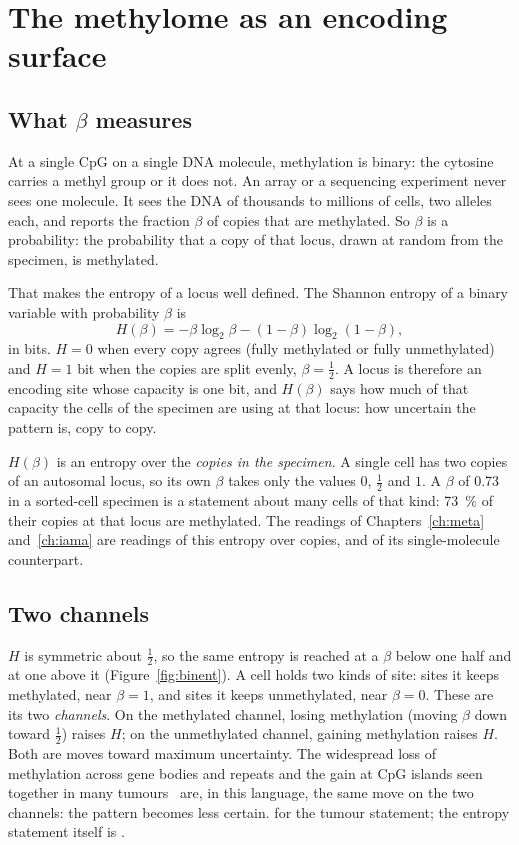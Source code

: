 \chapter{The methylome as an encoding surface}\label{ch:surface}

\section{What $\beta$ measures}

At a single CpG on a single DNA molecule, methylation is binary: the cytosine carries a methyl group
or it does not. An array or a sequencing experiment never sees one molecule. It sees the DNA of
thousands to millions of cells, two alleles each, and reports the fraction $\beta$ of copies that
are methylated. So $\beta$ is a probability: the probability that a copy of that locus, drawn at
random from the specimen, is methylated.

That makes the entropy of a locus well defined. The Shannon entropy of a binary variable with
probability $\beta$ is
\begin{equation}
  H(\beta)=-\beta\log_2\beta-(1-\beta)\log_2(1-\beta),
  \label{eq:H}
\end{equation}
in bits. $H=0$ when every copy agrees (fully methylated or fully unmethylated) and $H=1$ bit when
the copies are split evenly, $\beta=\tfrac12$. \derived{} A locus is therefore an encoding site
whose capacity is one bit, and $H(\beta)$ says how much of that capacity the cells of the specimen are
using at that locus: how uncertain the pattern is, copy to copy.

\begin{remark}
$H(\beta)$ is an entropy over the \emph{copies in the specimen}. A single cell has two copies of an
autosomal locus, so its own $\beta$ takes only the values $0$, $\tfrac12$ and $1$. A $\beta$ of 0.73
in a sorted-cell specimen is a statement about many cells of that kind: 73~\% of their copies at
that locus are methylated. The readings of Chapters~\ref{ch:meta} and~\ref{ch:iama} are readings of this entropy over copies, and of its single-molecule counterpart.
\end{remark}

\section{Two channels}

$H$ is symmetric about $\tfrac12$, so the same entropy is reached at a $\beta$ below one half and at one above it
(Figure~\ref{fig:binent}). A cell holds two kinds of site: sites it keeps methylated, near $\beta=1$, and sites it keeps
unmethylated, near $\beta=0$. These are its two \emph{channels}. On the methylated channel, losing methylation (moving $\beta$
down toward $\tfrac12$) raises $H$; on the unmethylated channel, gaining methylation raises $H$. Both are moves toward maximum
uncertainty. The widespread loss of methylation across gene bodies and repeats and the gain at CpG islands seen together in
many tumours~\cite{Baylin2011} are, in this language, the same move on the two channels: the pattern becomes less certain.
\analogy{} for the tumour statement; the entropy statement itself is \derived.


